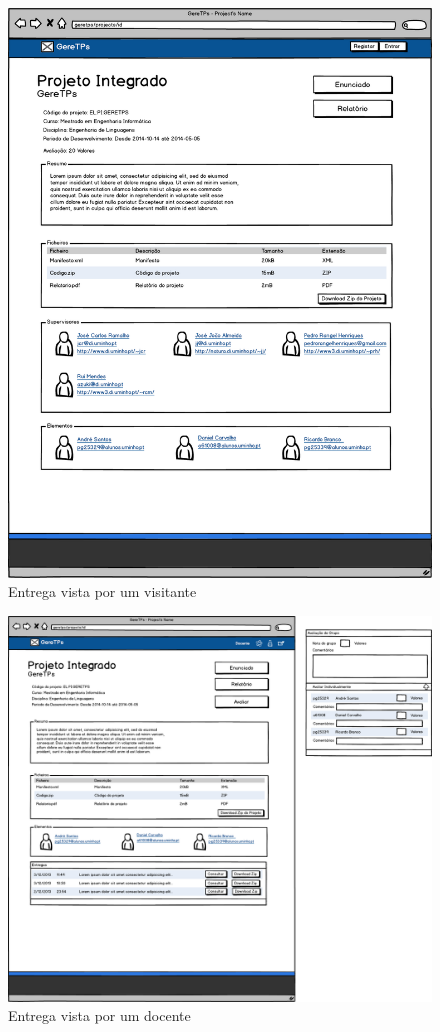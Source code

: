 \begin{figure}[htbp]
        \centering
        \includegraphics[width=1\textwidth]{images/prototipos/mockups/projetovisitante.png}
         \caption{Entrega vista por um visitante}
         \label{fig: projetoaluno}
\end{figure}

\begin{figure}[htbp]
        \centering
        \includegraphics[width=1\textwidth]{images/prototipos/mockups/projetodocente.png}
         \caption{Entrega vista por um docente}
         \label{fig: projetodocente}
\end{figure}
